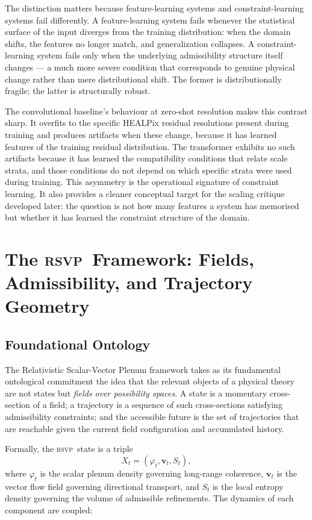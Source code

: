 \documentclass[11pt,a4paper]{article}
\theoremstyle{plain}
\theoremstyle{definition}
\theoremstyle{remark}
\newcommand{\RSVP}{\textup{\textsc{rsvp}}}
\begin{document}
The distinction matters because feature-learning systems and
constraint-learning systems fail differently. A feature-learning system
fails whenever the statistical surface of the input diverges from the training
distribution: when the domain shifts, the features no longer match, and
generalization collapses. A constraint-learning system fails only when the
underlying admissibility structure itself changes --- a much more severe
condition that corresponds to genuine physical change rather than mere
distributional shift. The former is distributionally fragile; the latter is
structurally robust.

The convolutional baseline's behaviour at zero-shot resolution makes this
contrast sharp. It overfits to the specific HEALPix residual resolutions
present during training and produces artifacts when these change, because it
has learned features of the training residual distribution. The transformer
exhibits no such artifacts because it has learned the compatibility conditions
that relate scale strata, and those conditions do not depend on which specific
strata were used during training. This asymmetry is the operational signature
of constraint learning. It also provides a cleaner conceptual target for
the scaling critique developed later: the question is not how many features
a system has memorised but whether it has learned the constraint structure
of the domain.

\section{The \RSVP\ Framework: Fields, Admissibility, and Trajectory Geometry}
\label{sec:rsvp}

\subsection{Foundational Ontology}

The Relativistic Scalar-Vector Plenum framework takes as its fundamental
ontological commitment the idea that the relevant objects of a physical
theory are not states but \textit{fields over possibility spaces}. A state
is a momentary cross-section of a field; a trajectory is a sequence of
such cross-sections satisfying admissibility constraints; and the
accessible future is the set of trajectories that are reachable given the
current field configuration and accumulated history.

Formally, the \RSVP\ state is a triple
\[
X_t = (\varphi_t, \mathbf{v}_t, S_t),
\]
where $\varphi_t$ is the scalar plenum density governing long-range
coherence, $\mathbf{v}_t$ is the vector flow field governing directional
transport, and $S_t$ is the local entropy density governing the volume of
admissible refinements. The dynamics of each component are coupled:
\end{document}
